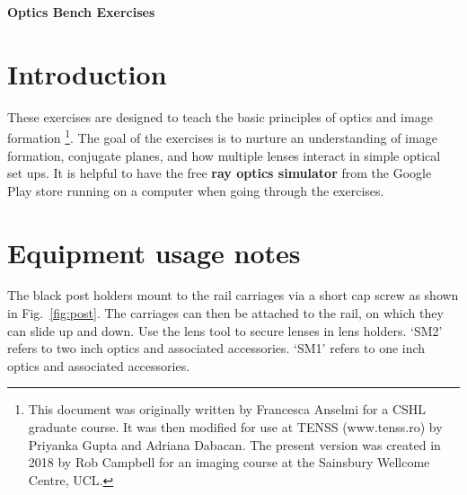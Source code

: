 \documentclass[a4paper]{report}
\begin{document}
\setcounter{secnumdepth}{2}

\begin{center}
\textbf{\Large{Optics Bench Exercises}}
\end{center}

\section{Introduction}
These exercises are designed to teach the basic principles of optics and image formation
\footnote{This document was originally written by Francesca Anselmi for a CSHL graduate course.
It was then modified for use at TENSS (www.tenss.ro) by Priyanka Gupta and Adriana Dabacan. 
The present version was created in 2018 by Rob Campbell for an imaging course at the Sainsbury Wellcome Centre, UCL.}.
The goal of the exercises is to nurture an understanding of image formation, conjugate planes, and how multiple lenses interact in simple optical set ups. 
It is helpful to have the free \textbf{ray optics simulator} from the Google Play store running on a computer when going through the exercises. 


\section{Equipment usage notes}
The black post holders mount to the rail carriages via a short cap screw as shown in Fig.~\ref{fig:post}. 
The carriages can then be attached to the rail, on which they can slide up and down. 
Use the lens tool to secure lenses in lens holders. 
`SM2' refers to two inch optics and associated accessories. 
`SM1' refers to one inch optics and associated accessories. 
\end{document}
